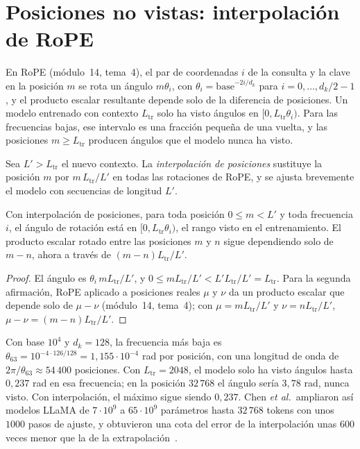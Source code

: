 \section{Posiciones no vistas: interpolación de RoPE}

En RoPE (módulo~14, tema~4), el par de coordenadas $i$ de la consulta y la clave en la posición $m$ se rota un ángulo $m\theta_i$, con $\theta_i=\text{base}^{-2i/d_k}$ para $i=0,\dots,d_k/2-1$, y el producto escalar resultante depende solo de la diferencia de posiciones. Un modelo entrenado con contexto $L_{\mathrm{tr}}$ solo ha visto ángulos en $[0,L_{\mathrm{tr}}\theta_i)$. Para las frecuencias bajas, ese intervalo es una fracción pequeña de una vuelta, y las posiciones $m\ge L_{\mathrm{tr}}$ producen ángulos que el modelo nunca ha visto.

\begin{definicion}
Sea $L'>L_{\mathrm{tr}}$ el nuevo contexto. La \emph{interpolación de posiciones} sustituye la posición $m$ por $m\,L_{\mathrm{tr}}/L'$ en todas las rotaciones de RoPE, y se ajusta brevemente el modelo con secuencias de longitud $L'$.
\end{definicion}

\begin{proposicion}\label{prop:pi}
Con interpolación de posiciones, para toda posición $0\le m<L'$ y toda frecuencia $i$, el ángulo de rotación está en $[0,L_{\mathrm{tr}}\theta_i)$, el rango visto en el entrenamiento. El producto escalar rotado entre las posiciones $m$ y $n$ sigue dependiendo solo de $m-n$, ahora a través de $(m-n)L_{\mathrm{tr}}/L'$.
\end{proposicion}

\begin{proof}
El ángulo es $\theta_i\,mL_{\mathrm{tr}}/L'$, y $0\le mL_{\mathrm{tr}}/L'<L'L_{\mathrm{tr}}/L'=L_{\mathrm{tr}}$. Para la segunda afirmación, RoPE aplicado a posiciones reales $\mu$ y $\nu$ da un producto escalar que depende solo de $\mu-\nu$ (módulo~14, tema~4); con $\mu=mL_{\mathrm{tr}}/L'$ y $\nu=nL_{\mathrm{tr}}/L'$, $\mu-\nu=(m-n)L_{\mathrm{tr}}/L'$.
\end{proof}

\begin{ejemplo}\label{ej:pi}
Con base $10^{4}$ y $d_k=128$, la frecuencia más baja es $\theta_{63}=10^{-4\cdot 126/128}=1{,}155\cdot 10^{-4}$ rad por posición, con una longitud de onda de $2\pi/\theta_{63}\approx 54\,400$ posiciones. Con $L_{\mathrm{tr}}=2048$, el modelo solo ha visto ángulos hasta $0{,}237$ rad en esa frecuencia; en la posición $32\,768$ el ángulo sería $3{,}78$ rad, nunca visto. Con interpolación, el máximo sigue siendo $0{,}237$. Chen \emph{et al.}\ ampliaron así modelos LLaMA de $7\cdot 10^{9}$ a $65\cdot 10^{9}$ parámetros hasta $32\,768$ tokens con unos $1000$ pasos de ajuste, y obtuvieron una cota del error de la interpolación unas $600$ veces menor que la de la extrapolación~\cite{chenpi}.
\end{ejemplo}

